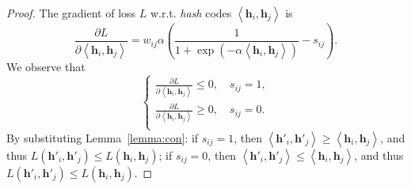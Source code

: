 \documentclass[10pt,twocolumn,letterpaper]{article}
\begin{document}
\begin{proof}
The gradient of loss $L$ w.r.t. \emph{hash} codes $\left\langle {{\bm{h}}_i, {\bm{h}}_j} \right\rangle$ is
\begin{equation}\label{eqn:dinnerproduct}
\frac{{\partial L}}{{\partial  \left\langle {{\bm{h}}_i, {\bm{h}}_j} \right\rangle }} = w_{ij} \alpha \left( {\frac{1}{{1 + \exp \left( {-\alpha  \left\langle {{\bm{h}}_i, {\bm{h}}_j} \right\rangle } \right)}} - {s_{ij}}} \right). 
\end{equation}
We observe that
\begin{equation}\label{eqn:dinnerproduct_case}
  \begin{cases}
    \frac{{\partial L}}{{\partial  \left\langle {{\bm{h}}_i, {\bm{h}}_j} \right\rangle }} \leqslant 0,\quad {s_{ij}} = 1, \\
    \frac{{\partial L}}{{\partial  \left\langle {{\bm{h}}_i, {\bm{h}}_j} \right\rangle }} \geqslant 0,\quad {s_{ij}} = 0. \\ 
  \end{cases}
\end{equation}
By substituting Lemma~\ref{lemma:con}: if ${s_{ij}} = 1$, then $\left\langle {\bm{h}'_i, \bm{h}'_j} \right\rangle \geqslant \left\langle {{\bm{h}}_i, {\bm{h}}_j} \right\rangle$, and thus $L(\bm{h}'_i, \bm{h}'_j) \leqslant L(\bm{h}_i, \bm{h}_j)$; if ${s_{ij}} = 0$, then $\left\langle {\bm{h}'_i, \bm{h}'_j} \right\rangle \leqslant \left\langle {{\bm{h}}_i, {\bm{h}}_j} \right\rangle$, and thus $L(\bm{h}'_i, \bm{h}'_j) \leqslant L(\bm{h}_i, \bm{h}_j)$.
\end{proof}



\end{document}

